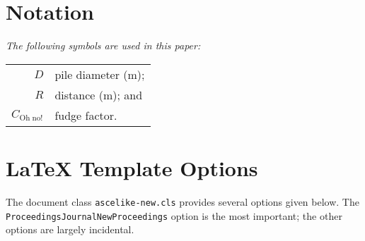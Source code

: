 \documentclass[
  NewProceedings,
  letterpaper]{./assets/ascelike-new}
\begin{document}
\hypertarget{app:notation}{%
\section{Notation}\label{app:notation}}

\emph{The following symbols are used in this paper:}

\begin{longtable}[]{@{}rl@{}}
\toprule()
\endhead
\(D\) & pile diameter (m); \\
\(R\) & distance (m); and \\
\(C_{\mathrm{Oh\;no!}}\) & fudge factor. \\
\bottomrule()
\end{longtable}

\hypertarget{app:options}{%
\section{LaTeX Template Options}\label{app:options}}

The document class \texttt{ascelike-new.cls} provides several options
given below. The
\texttt{Proceedings\textbar{}\textasciigrave{}\textasciigrave{}Journal\textbar{}\textasciigrave{}\textasciigrave{}NewProceedings}
option is the most important; the other options are largely incidental.
\end{document}
